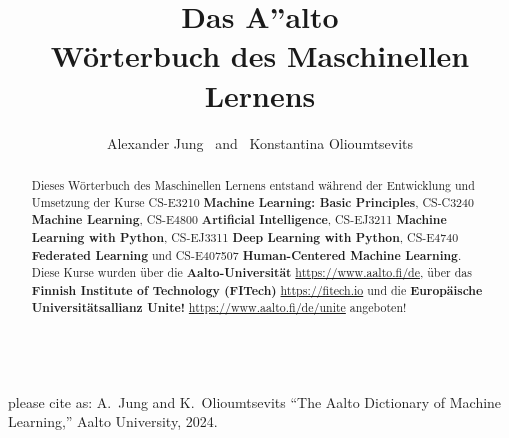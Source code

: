 \documentclass[journal,12pt,onecolumn]{article}
\begin{document}
\title {\vspace*{-10mm}
	{\huge {\bf Das {\fontsize{40}{48}\selectfont \textbf{\textsf{A\hspace*{-2mm}''}}}\hspace*{-4mm}alto \\ Wörterbuch des Maschinellen Lernens}}  \\[-5mm] 
}

\author{\hspace{-2mm}Alexander Jung \ and \ Konstantina Olioumtsevits \\[-2mm]%
}

\maketitle
	\begin{center}
	\\[3mm]
	please cite as: A.\ Jung and K.\ Olioumtsevits ``The Aalto Dictionary of Machine Learning,'' Aalto University, 2024.
\end{center}

\begin{abstract}
Dieses Wörterbuch des Maschinellen Lernens entstand während der Entwicklung und 
Umsetzung der Kurse CS-E3210 {\bf Machine Learning: Basic Principles}, CS-C3240 {\bf Machine Learning}, 
CS-E4800 {\bf Artificial Intelligence}, CS-EJ3211 {\bf Machine Learning with Python}, 
CS-EJ3311 {\bf Deep Learning with Python}, CS-E4740 {\bf Federated Learning} 
und CS-E407507 {\bf Human-Centered Machine Learning}. Diese Kurse wurden 
über die {\bf Aalto-Universität} \url{https://www.aalto.fi/de}, 
über das {\bf Finnish Institute of Technology (FITech)} \url{https://fitech.io} und die {\bf Europäische Universitätsallianz Unite!} \url{https://www.aalto.fi/de/unite} angeboten!
\end{abstract}



\newpage 
%

\newpage
\glsaddallunused
\printglossary[nonumberlist]


\newpage
{}
\pagestyle{empty}  %
\printindex  %




\newpage


\end{document}
